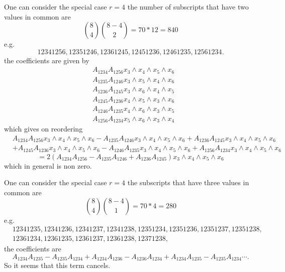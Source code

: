 \documentclass[aps, preprint]{revtex4}
\begin{document}
One can consider the special case $r =4$ the number of subscripts that have two values in common are
\begin{equation}\binom{8}{4} \binom{8 -4}{2} =70 \ast 12 =840
\end{equation}e.g.
\begin{equation}12341256,12351246,12361245,12451236,12461235,12561234.
\end{equation}the coefficients are given by
\begin{align} & A_{1 2 3 4} A_{1 2 5 6} x_{3} \wedge x_{4} \wedge x_{5} \wedge x_{6} \\
 & A_{1 2 3 5} A_{1 2 4 6} x_{3} \wedge x_{5} \wedge x_{4} \wedge x_{6} \\
 & A_{1 2 3 6} A_{1 2 4 5} x_{3} \wedge x_{6} \wedge x_{4} \wedge x_{5} \\
 & A_{1 2 4 5} A_{1 2 3 6} x_{4} \wedge x_{5} \wedge x_{3} \wedge x_{6} \\
 & A_{1 2 4 6} A_{1 2 3 5} x_{4} \wedge x_{6} \wedge x_{3} \wedge x_{5} \\
 & A_{1 2 5 6} A_{1 2 3 4} x_{5} \wedge x_{6} \wedge x_{3} \wedge x_{4}\end{align}which gives on reordering
\begin{align} & A_{1 2 3 4} A_{1 2 5 6} x_{3} \wedge x_{4} \wedge x_{5} \wedge x_{6} -A_{1 2 3 5} A_{1 2 4 6} x_{3} \wedge x_{4} \wedge x_{5} \wedge x_{6} +A_{1 2 3 6} A_{1 2 4 5} x_{3} \wedge x_{4} \wedge x_{5} \wedge x_{6} \\
 &  +A_{1 2 4 5} A_{1 2 3 6} x_{3} \wedge x_{4} \wedge x_{5} \wedge x_{6} -A_{1 2 4 6} A_{1 2 3 5} x_{3} \wedge x_{4} \wedge x_{5} \wedge x_{6} +A_{1 2 5 6} A_{1 2 3 4} x_{3} \wedge x_{4} \wedge x_{5} \wedge x_{6}\end{align}
\begin{equation} =2 \left (A_{1 2 3 4} A_{1 2 5 6} -A_{1 2 3 5} A_{1 2 4 6} +A_{1 2 3 6} A_{1 2 4 5}\right ) x_{3} \wedge x_{4} \wedge x_{5} \wedge x_{6}
\end{equation}which in general is non zero. 

One can consider the special case $r =4$ the subscripts that have three values in common are
\begin{equation}\binom{8}{4} \binom{8 -4}{1} =70 \ast 4 =280
\end{equation}e.g.
\begin{align} & 12341235,12341236,12341237,12341238,12351234,12351236,12351237,12351238\text{,} \\
 & 12361234,12361235,12361237,12361238,12371238\text{,}\end{align}the coefficients are
\begin{equation}A_{1 2 3 4} A_{1 2 3 5} -A_{1 2 3 5} A_{1 2 3 4} +A_{1 2 3 4} A_{1 2 3 6} -A_{1 2 3 6} A_{1 2 3 4} +A_{1 2 3 4} A_{1 2 3 5} -A_{1 2 3 5} A_{1 2 3 4} \cdots \text{.}
\end{equation}So it seems that this term cancels. 
\end{document}
